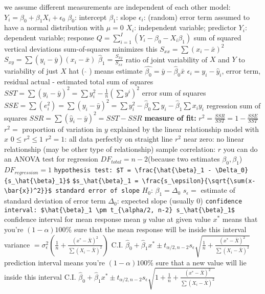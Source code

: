 \documentclass{article}
\begin{document}
\begin{multicols*}{2}
\begin{outline}[compactitem]
  \1 we assume different measurements are independent of each other
  \1 model: $Y_i=\beta_0 + \beta_1 X_i + \epsilon_0$
    \2 $\beta_0$: intercept
    \2 $\beta_1$: slope
    \2 $\epsilon_i$: (random) error term
      \3 assumed to have a normal distribution with $\mu=0$
    \2 $X_i$: independent variable; predictor
    \2 $Y_i$: dependent variable; response
  \1 $Q = \sum_{i=1}^{I} ( Y_i - \beta_0 - X_i\beta_1 )$
    \2 sum of squared vertical deviations
    \2 sum-of-squares minimizes this
  \1 $S_{xx} = \sum(x_i - \bar{x})^2$
  \1 $S_{xy} = \sum(y_i - \bar{y})(x_i - \bar{x})$
  \1 $\hat{\beta}_1 = \frac{S_{xy}}{S_{xx}}$ ratio of joint variability of $X$ and $Y$ to variability of just $X$
    \2 hat ( $\hat{}$ ) means estimate
  \1 $\hat{\beta_0} = \bar{y}-\hat{\beta}_0\bar{x}$
  \1 $\epsilon_i = y_i - \hat{y}_i$, error term, residual
    \2 actual - estimated
  \1 total sum of squares $SST = \sum(y_i - \bar{y})^2 = \sum y_i^2 - \frac{1}{n}(\sum y^i)^2$
  \1 error sum of squares$SSE 
    = \sum (e_i^2) 
    = \sum (y_i - \bar{y})^2 
    = \sum y_i^2 - \hat{\beta}_0\sum y_i - \hat{\beta}_1\sum x_i y_i
    $
  \1 regression sum of squares $SSR = \sum (\hat{y}_i - \bar{y})^2 = SST-SSR $
  \1 \textbf{measure of fit:} $r^2 = \frac{SSR}{SST} = 1- \frac{SSE}{SST}$
  \2 $r^2=$ proportion of variation in $y$ explained by the linear relationship model with $x$
    \2 $0 \leq r^2 \leq 1$
    \2 $r^2 = 1$: all data perfectly on straight line
    \2 $r^2$ near zero: no linear relationship (may be other type of relationship)
  \1 sample correlation: $r$
  \1 you can do an ANOVA test for regression
    \2 $DF_{total} = n-2$(because two estimates $\beta_0, \beta_1$)
    \2 $DF_{regression} = 1$
  \1 \verb|hypothesis test: $T = \frac{\hat{\beta}_1 - \Delta_0}{s_\hat{\beta}_1}$|
    \2 \verb|$s_\hat{\beta}_1 = \frac{s_\epsilon}{\sqrt{\sum(x-\bar{x})^2}}$ standard error of slope|
    \2 $H_0$: $\beta_1 = \Delta_0$
    \2 $s_\epsilon = $ estimate of standard deviation of error term
    \2 $\Delta_0$: expected slope (usually 0)
    \2 \verb|confidence interval: $\hat{\beta}_1 \pm t_{\alpha/2, n-2} s_\hat{\beta}_1$|
  \1 confidence interval for mean response
    \2 mean $y$ value at given value $x^*$
    \2 means that you're $(1-\alpha)100\%$ sure that the mean response will be inside this interval
    \2 variance $=\sigma_{\epsilon}^2\left( \frac{1}{n} + \frac{(x^* - \bar{X})^2 }{\sum(X_i - \bar{X})^2 } \right)$
    \2 C.I. $\hat{\beta}_0 
      + \hat{\beta}_1 x^* 
      \pm t_{\alpha/2, n-2} s_\epsilon \sqrt{ \frac{1}{n} + \frac{(x^* - \bar{X})^2 }{\sum(X_i - \bar{X})^2 } }$
  \1 prediction interval
    \2 means you're $(1-\alpha)100\%$ sure that a new value will lie inside this interval
    \2 C.I. $\hat{\beta}_0 
      + \hat{\beta}_1 x^* 
      \pm t_{\alpha/2, n-2} s_\epsilon \sqrt{ 1 + \frac{1}{n} + \frac{(x^* - \bar{X})^2 }{\sum(X_i - \bar{X})^2 } }$




\end{outline}
\end{multicols*}
\end{document}
